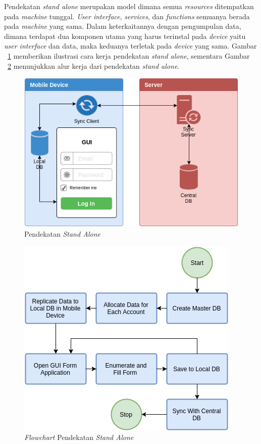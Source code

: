 Pendekatan \textit{stand alone} merupakan model dimana semua \textit{resources} ditempatkan pada \textit{machine} tunggal. \textit{User interface}, \textit{services}, dan \textit{functions} semuanya berada pada \textit{machine} yang sama. Dalam keterkaitannya dengan pengumpulan data, dimana terdapat dua komponen utama yang harus terinstal pada \textit{device} yaitu \textit{user interface} dan data, maka keduanya terletak pada \textit{device} yang sama. Gambar ~\ref{fig:design-stand-alone} memberikan ilustrasi cara kerja pendekatan \textit{stand alone}, sementara Gambar ~\ref{fig:design-stand-alone-flowchart} menunjukkan alur kerja dari pendekatan \textit{stand alone}.


\begin{figure}[h]
    \centering
    \includegraphics[width=.7\textwidth]{../../Resources/Images/design-stand-alone}
    \caption{Pendekatan \textit{Stand Alone}}
    \label{fig:design-stand-alone}
\end{figure}

\begin{figure}[h]
    \centering
    \includegraphics[width=.7\textwidth]{../../Resources/Images/design-stand-alone-flowchart}
    \caption{\textit{Flowchart} Pendekatan \textit{Stand Alone}}
    \label{fig:design-stand-alone-flowchart}
\end{figure}


